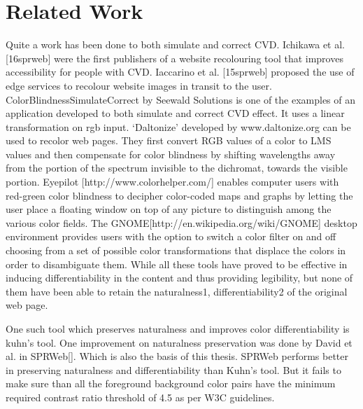 

\section{Related Work}
\label{Related Work}

Quite a work has been done to both simulate and correct CVD. Ichikawa et al. [16sprweb] were the first publishers of a website recolouring tool that improves accessibility for people with CVD. Iaccarino et al. [15sprweb] proposed the use of edge services to recolour website images in transit to the user. ColorBlindnessSimulateCorrect by Seewald Solutions is one of the examples of an application developed to both simulate and correct CVD effect. It uses a linear transformation on rgb input. ‘Daltonize’ developed by www.daltonize.org can be used to recolor web pages. They first convert RGB values of a color to LMS values and then compensate for color blindness by shifting wavelengths away from the portion of the spectrum invisible to the dichromat, towards the visible portion.  Eyepilot [http://www.colorhelper.com/] enables computer users with red-green color blindness to decipher color-coded maps and graphs by letting the user place a floating window on top of any picture to distinguish among the various color fields. The GNOME[http://en.wikipedia.org/wiki/GNOME] desktop environment provides users with the option to switch a color filter on and off choosing from a set of possible color transformations that displace the colors in order to disambiguate them. While all these tools have proved to be effective in inducing differentiability in the content and thus providing legibility, but none of them have been able to retain the naturalness1, differentiability2 of the original web page.

One such tool which preserves naturalness and improves color differentiability is kuhn’s tool. One improvement on naturalness preservation was done by David et al. in SPRWeb[]. Which is also the basis of this thesis. SPRWeb performs better in preserving naturalness and differentiability than Kuhn’s tool. But it fails to make sure than all the foreground background color pairs have the minimum required contrast ratio threshold of 4.5 as per W3C guidelines.

